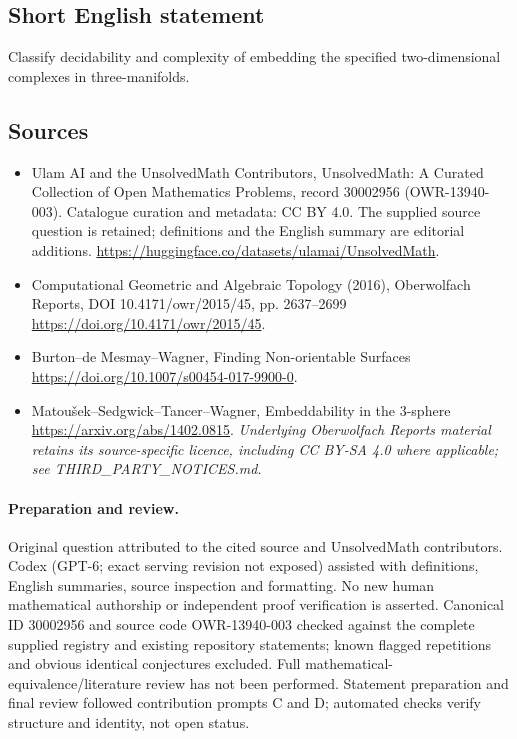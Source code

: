 \documentclass[11pt]{article}
\begin{document}
\subsection{Short English statement}
Classify decidability and complexity of embedding the specified two-dimensional complexes in three-manifolds.
\subsection{Sources}
\begin{itemize}
\item[\hypertarget{source:30002956:1}{S1}] Ulam AI and the UnsolvedMath Contributors, UnsolvedMath: A Curated Collection of Open Mathematics Problems, record 30002956 (OWR-13940-003). Catalogue curation and metadata: CC BY 4.0. The supplied source question is retained; definitions and the English summary are editorial additions.
\url{https://huggingface.co/datasets/ulamai/UnsolvedMath}.
\item[\hypertarget{source:30002956:2}{S2}] Computational Geometric and Algebraic Topology (2016), Oberwolfach Reports, DOI 10.4171/owr/2015/45, pp. 2637--2699
\url{https://doi.org/10.4171/owr/2015/45}.
\item[\hypertarget{source:30002956:3}{S3}] Burton--de Mesmay--Wagner, Finding Non-orientable Surfaces
\url{https://doi.org/10.1007/s00454-017-9900-0}.
\item[\hypertarget{source:30002956:4}{S4}] Matoušek--Sedgwick--Tancer--Wagner, Embeddability in the 3-sphere
\url{https://arxiv.org/abs/1402.0815}.
\textit{Underlying Oberwolfach Reports material retains its source-specific licence, including CC BY-SA 4.0 where applicable; see THIRD\_PARTY\_NOTICES.md.}
\end{itemize}
\paragraph{Preparation and review.}
Original question attributed to the cited source and UnsolvedMath contributors. Codex (GPT-6; exact serving revision not exposed) assisted with definitions, English summaries, source inspection and formatting. No new human mathematical authorship or independent proof verification is asserted. Canonical ID 30002956 and source code OWR-13940-003 checked against the complete supplied registry and existing repository statements; known flagged repetitions and obvious identical conjectures excluded. Full mathematical-equivalence/literature review has not been performed. Statement preparation and final review followed contribution prompts C and D; automated checks verify structure and identity, not open status.
\label{end:30002956}
\end{document}

